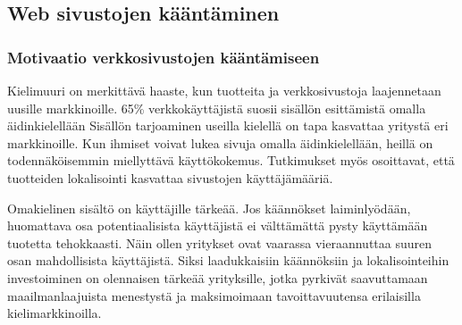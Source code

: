 \documentclass[11pt,a4paper,titlepage,oneside]{article}
\begin{document}
\newpage
\subsection{Web sivustojen kääntäminen}






\subsubsection{Motivaatio verkkosivustojen kääntämiseen}










Kielimuuri on merkittävä haaste, kun tuotteita ja verkkosivustoja laajennetaan uusille markkinoille.
65\% verkkokäyttäjistä suosii sisällön esittämistä omalla äidinkielellään
Sisällön tarjoaminen useilla kielellä on tapa kasvattaa yritystä eri markkinoille. 
Kun ihmiset voivat lukea sivuja omalla äidinkielellään, heillä on todennäköisemmin miellyttävä käyttökokemus.
Tutkimukset myös osoittavat, että tuotteiden lokalisointi kasvattaa sivustojen käyttäjämääriä.
\medskip



Omakielinen sisältö on käyttäjille tärkeää.
Jos käännökset laiminlyödään, huomattava osa potentiaalisista käyttäjistä ei välttämättä pysty käyttämään tuotetta tehokkaasti.
Näin ollen yritykset ovat vaarassa vieraannuttaa suuren osan mahdollisista käyttäjistä.
% 
Siksi laadukkaisiin käännöksiin ja lokalisointeihin investoiminen on olennaisen tärkeää yrityksille,
jotka pyrkivät saavuttamaan maailmanlaajuista menestystä ja maksimoimaan tavoittavuutensa erilaisilla kielimarkkinoilla.
\medskip %
\end{document}
